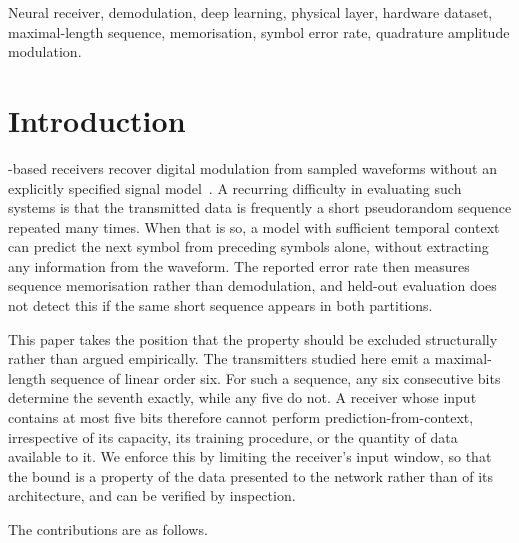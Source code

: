 \documentclass[journal]{IEEEtran}   %
\begin{document}
\begin{IEEEkeywords}
Neural receiver, demodulation, deep learning, physical layer, hardware dataset,
maximal-length sequence, memorisation, symbol error rate, quadrature amplitude
modulation.
\end{IEEEkeywords}

\section{Introduction}
-based receivers recover digital modulation from
sampled waveforms without an explicitly specified signal
model~\cite{oshea2017intro,dorner2018ota,ye2018power}. A recurring difficulty in
evaluating such systems is that the transmitted data is frequently a short
pseudorandom sequence repeated many times. When that is so, a model with
sufficient temporal context can predict the next symbol from preceding symbols
alone, without extracting any information from the waveform. The reported error
rate then measures sequence memorisation rather than demodulation, and held-out
evaluation does not detect this if the same short sequence appears in both
partitions.

This paper takes the position that the property should be excluded structurally
rather than argued empirically. The transmitters studied here emit a
maximal-length sequence of linear order six. For such a sequence, any six
consecutive bits determine the seventh exactly, while any five do not. A
receiver whose input contains at most five bits therefore cannot perform
prediction-from-context, irrespective of its capacity, its training procedure,
or the quantity of data available to it. We enforce this by limiting the
receiver's input window, so that the bound is a property of the data presented
to the network rather than of its architecture, and can be verified by
inspection.

The contributions are as follows.
\end{document}
